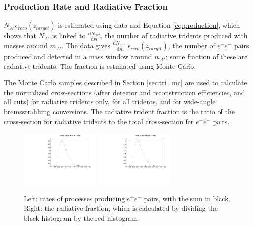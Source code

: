 \subsubsection{Production Rate and Radiative Fraction}

$N_{A'}\epsilon_{reco}(z_{target})$ is estimated using data and Equation \ref{eq:production}, which shows that $N_{A'}$ is linked to $\frac{\mathrm{d}N_{rad}}{\mathrm{d}m}$, the number of radiative tridents produced with masses around $m_{A'}$.
The data gives $\frac{\mathrm{d}N_{e^+e^-}}{\mathrm{d}m}\epsilon_{reco}(z_{target})$, the number of $e^+e^-$ pairs produced and detected in a mass window around $m_{A'}$; some fraction of these are radiative tridents.
The fraction is estimated using Monte Carlo.

The Monte Carlo samples described in Section \ref{sec:tri_mc} are used to calculate the normalized cross-sections (after detector and reconstruction efficiencies, and all cuts) for radiative tridents only, for all tridents, and for wide-angle bremsstrahlung conversions.
The radiative trident fraction is the ratio of the cross-section for radiative tridents to the total cross-section for $e^+e^-$ pairs.

\begin{figure}[ht]
\begin{center}
    \includegraphics[width=0.35\textwidth,page=5,angle=-90]{vertexing/figs/frac}
    \includegraphics[width=0.35\textwidth,page=6,angle=-90]{vertexing/figs/frac}
\end{center}
    \caption{Left: rates of processes producing $e^+e^-$ pairs, with the sum in black. Right: the radiative fraction, which is calculated by dividing the black histogram by the red histogram.}
    \label{fig:radfrac}
\end{figure}

